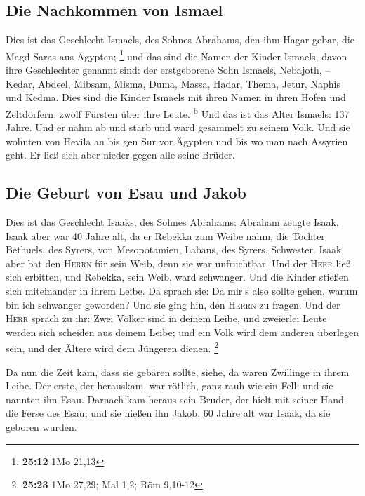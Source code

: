 \hypertarget{die-nachkommen-von-ismael}{%
\subsection{Die Nachkommen von Ismael}\label{die-nachkommen-von-ismael}}

 Dies ist das Geschlecht Ismaels, des Sohnes Abrahams,
den ihm Hagar gebar, die Magd Saras aus Ägypten; \footnote{\textbf{25:12}
  1Mo 21,13}  und das sind die Namen der Kinder Ismaels,
davon ihre Geschlechter genannt sind: der erstgeborene Sohn Ismaels,
Nebajoth, -- Kedar, Abdeel, Mibsam,  Misma, Duma, Massa,
 Hadar, Thema, Jetur, Naphis und Kedma. 
Dies sind die Kinder Ismaels mit ihren Namen in ihren Höfen und
Zeltdörfern, zwölf Fürsten über ihre Leute. \textsuperscript{b}
 Und das ist das Alter Ismaels: 137 Jahre. Und er nahm ab
und starb und ward gesammelt zu seinem Volk.  Und sie
wohnten von Hevila an bis gen Sur vor Ägypten und bis wo man nach
Assyrien geht. Er ließ sich aber nieder gegen alle seine Brüder.

\hypertarget{die-geburt-von-esau-und-jakob}{%
\subsection{Die Geburt von Esau und
Jakob}\label{die-geburt-von-esau-und-jakob}}

 Dies ist das Geschlecht Isaaks, des Sohnes Abrahams:
Abraham zeugte Isaak.  Isaak aber war 40 Jahre alt, da er
Rebekka zum Weibe nahm, die Tochter Bethuels, des Syrers, von
Mesopotamien, Labans, des Syrers, Schwester.  Isaak aber
bat den \textsc{Herrn} für sein Weib, denn sie war unfruchtbar. Und der
\textsc{Herr} ließ sich erbitten, und Rebekka, sein Weib, ward
schwanger.  Und die Kinder stießen sich miteinander in
ihrem Leibe. Da sprach sie: Da mir's also sollte gehen, warum bin ich
schwanger geworden? Und sie ging hin, den \textsc{Herrn} zu fragen.
 Und der \textsc{Herr} sprach zu ihr: Zwei Völker sind in
deinem Leibe, und zweierlei Leute werden sich scheiden aus deinem Leibe;
und ein Volk wird dem anderen überlegen sein, und der Ältere wird dem
Jüngeren dienen. \footnote{\textbf{25:23} 1Mo 27,29; Mal 1,2; Röm
  9,10-12}

 Da nun die Zeit kam, dass sie gebären sollte, siehe, da
waren Zwillinge in ihrem Leibe.  Der erste, der
herauskam, war rötlich, ganz rauh wie ein Fell; und sie nannten ihn
Esau.  Darnach kam heraus sein Bruder, der hielt mit
seiner Hand die Ferse des Esau; und sie hießen ihn Jakob. 60 Jahre alt
war Isaak, da sie geboren wurden.


